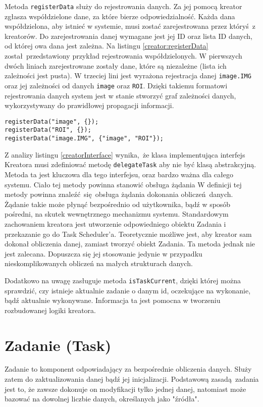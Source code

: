 Metoda \lstinline$registerData$ służy do rejestrowania danych. Za jej pomocą kreator zgłasza współdzielone dane, za które bierze odpowiedzialność. Każda dana współdzielona, aby istnieć w systemie, musi zostać zarejestrowana przez któryś z kreatorów. Do zarejestrowania danej wymagane jest jej ID oraz lista ID danych, od której owa dana jest zależna. Na listingu \ref{creator:registerData} został przedstawiony przykład rejestrowania współdzielonych. W pierwszych dwóch liniach zarejestrowane zostały dane, które są niezależne (lista ich zależności jest pusta). W trzeciej lini jest wyrażona rejestracja danej \lstinline$image.IMG$ oraz jej zależności od danych \lstinline$image$ oraz \lstinline$ROI$. Dzięki takiemu formatowi rejestrowania danych system jest w stanie stworzyć graf zależności danych, wykorzystywany do prawidłowej propagacji informacji.

\begin{minipage}{\textwidth}
	\begin{lstlisting}[label=creator:registerData, caption={Przykłady rejestrowania danych},alsoletter={()[].=}]
registerData("image", {});
registerData("ROI", {});
registerData("image.IMG", {"image", "ROI"});
	\end{lstlisting}
\end{minipage}

Z analizy listingu \ref{creatorInterface} wynika, że klasa implementująca interfejs Kreatora musi zdefiniować metodę \lstinline$delegateTask$ aby nie być klasą abstrakcyjną. Metoda ta jest kluczowa dla tego interfejsu, oraz bardzo ważna dla całego systemu. Ciało tej metody powinna stanowić obsługa żądania W definicji tej metody powinna znaleźć się obsługa żądania dokonania obliczeń danych. Żądanie takie może płynąć bezpośrednio od użytkownika, bądź w sposób pośredni, na skutek wewnętrznego mechanizmu systemu. Standardowym zachowaniem kreatora jest utworzenie odpowiedniego obiektu Zadania i przekazanie go do Task Scheduler'a. Teoretycznie możliwe jest, aby kreator sam dokonał obliczenia danej, zamiast tworzyć obiekt Zadania. Ta metoda jednak nie jest zalecana. Dopuszcza się jej stosowanie jedynie w przypadku nieskomplikowanych obliczeń na małych strukturach danych. 

Dodatkowo na uwagę zasługuje metoda \lstinline$isTaskCurrent$, dzięki której można sprawdzić, czy istnieje aktualnie zadanie o danym id, oczekujące na wykonanie, bądź aktualnie wykonywane. Informacja ta jest pomocna w tworzeniu rozbudowanej logiki kreatora.

\section{Zadanie (Task)}
Zadanie to komponent odpowiadający za bezpośrednie obliczenia danych. Służy zatem do zaktualizowania danej bądź jej inicjalizacji. Podstawową zasadą zadania jest to, że zawsze dokonuje on modyfikacji tylko jednej danej, natomiast może bazować na dowolnej liczbie danych, określanych jako "źródła". 


